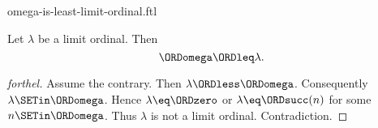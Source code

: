 \documentclass{naproche-library}
\begin{document}
\begin{smodule}[title=$\omega$ is the Least Limit Ordinal]{omega-is-least-limit-ordinal.ftl}

\begin{proposition}[forthel,id=SET_THEORY_03_5517271459954688]
  Let $\lambda$ be a limit ordinal.
  Then \[ \ORDomega \ORDleq \lambda. \]
\end{proposition}
\begin{proof}[forthel]
  Assume the contrary.
  Then $\lambda \ORDless \ORDomega$.
  Consequently $\lambda \SETin \ORDomega$.
  Hence $\lambda \eq \ORDzero$ or $\lambda \eq \ORDsucc(n)$ for some $n \SETin \ORDomega$.
  Thus $\lambda$ is not a limit ordinal.
  Contradiction.
\end{proof}
\end{smodule}
\end{document}
